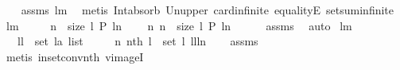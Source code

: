 \begin{isabellebody}
%
\isadelimproof
\ \ %
\endisadelimproof
%
\isatagproof
{}\isamarkupfalse%
\ assms\ lm{}{}{}\ \isamarkupfalse%
\ {\isacharparenleft}metis\ Int{\isacharunderscore}absorb{}\ Un{\isacharunderscore}upper{}\ card{\isacharunderscore}infinite\ equalityE\ setsum{\isachardot}infinite{\isacharparenright}%
\endisatagproof
{\isafoldproof}%
%
\isadelimproof
%
\endisadelimproof
%
\isamarkuptrue%
\isamarkupfalse%
\ lm{}{}{}{\isacharcolon}\ \isanewline
\ \ \ {\isachardoublequoteopen}{\isasymexists}\ n\ {\isasymin}\ {\isacharbraceleft}{}{\isachardot}{\isachardot}{\isacharless}size\ l{\isacharbraceright}{\isachardot}\ P\ {\isacharparenleft}l{\isacharbang}n{\isacharparenright}{\isachardoublequoteclose}\ \isanewline
\ \ \ {\isachardoublequoteopen}{\isacharbrackleft}n{\isachardot}\ n\ {\isasymleftarrow}\ {\isacharbrackleft}{}{\isachardot}{\isachardot}{\isacharless}size\ l{\isacharbrackright}{\isacharcomma}\ P\ {\isacharparenleft}l{\isacharbang}n{\isacharparenright}{\isacharbrackright}\ {\isasymnoteq}\ {\isacharbrackleft}{\isacharbrackright}{\isachardoublequoteclose}\isanewline
%
\isadelimproof
\ \ %
\endisadelimproof
%
\isatagproof
{}\isamarkupfalse%
\ assms\ \isamarkupfalse%
\ auto%
\endisatagproof
{\isafoldproof}%
%
\isadelimproof
\isanewline
%
\endisadelimproof
\isanewline
\isanewline
{}\isamarkupfalse%
\ lm{}{}{}{\isacharcolon}\ \isanewline
\ \ \ {\isachardoublequoteopen}ll\ {\isasymin}\ set\ {\isacharparenleft}l{\isacharcolon}{\isacharcolon}{\isacharprime}a\ list{\isacharparenright}{\isachardoublequoteclose}\ \isanewline
\ \ \ {\isachardoublequoteopen}{\isasymexists}\ n{\isasymin}\ {\isacharparenleft}nth\ l{\isacharparenright}\ {\isacharminus}{\isacharbackquote}\ {\isacharparenleft}set\ l{\isacharparenright}{\isachardot}\ ll{\isacharequal}l{\isacharbang}n{\isachardoublequoteclose}\isanewline
%
\isadelimproof
\ \ %
\endisadelimproof
%
\isatagproof
{}\isamarkupfalse%
\ assms{\isacharparenleft}{}{\isacharparenright}\ \isamarkupfalse%
\ {\isacharparenleft}metis\ in{\isacharunderscore}set{\isacharunderscore}conv{\isacharunderscore}nth\ vimageI{}{\isacharparenright}%
\endisatagproof
{\isafoldproof}%
%
\isadelimproof
\isanewline
%
\endisadelimproof
\isanewline
\isanewline
{}\isamarkupfalse%

\end{isabellebody}
